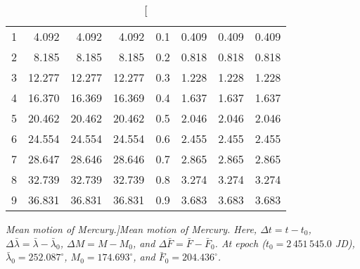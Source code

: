 \begin{table}
\begin{tabular}{rrrr|rrrr}
1 &   4.092 &   4.092 &   4.092 & 0.1 &   0.409 &   0.409 &   0.409\\
2 &   8.185 &   8.185 &   8.185 & 0.2 &   0.818 &   0.818 &   0.818\\
3 &  12.277 &  12.277 &  12.277 & 0.3 &   1.228 &   1.228 &   1.228\\
4 &  16.370 &  16.369 &  16.369 & 0.4 &   1.637 &   1.637 &   1.637\\
5 &  20.462 &  20.462 &  20.462 & 0.5 &   2.046 &   2.046 &   2.046\\
6 &  24.554 &  24.554 &  24.554 & 0.6 &   2.455 &   2.455 &   2.455\\
7 &  28.647 &  28.646 &  28.646 & 0.7 &   2.865 &   2.865 &   2.865\\
8 &  32.739 &  32.739 &  32.739 & 0.8 &   3.274 &   3.274 &   3.274\\
9 &  36.831 &  36.831 &  36.831 & 0.9 &   3.683 &   3.683 &   3.683\\
\end{tabular}
\caption[\em Mean motion of Mercury.]{\em Mean motion of Mercury.  Here, $\Delta t = t-t_0$, $\Delta\bar{\lambda} = \bar{\lambda}-\bar{\lambda}_0$, $\Delta M = M - M_0$, and $\Delta \bar{F} = \bar{F} - \bar{F}_0$. At epoch  ($t_0 = 2\,451\,545.0$ JD), $\bar{\lambda}_0 = 252.087^\circ$,  $M_0 = 174.693^\circ$,
and $\bar{F}_0 = 204.436^\circ$. }\label{vt20}
\end{table}

